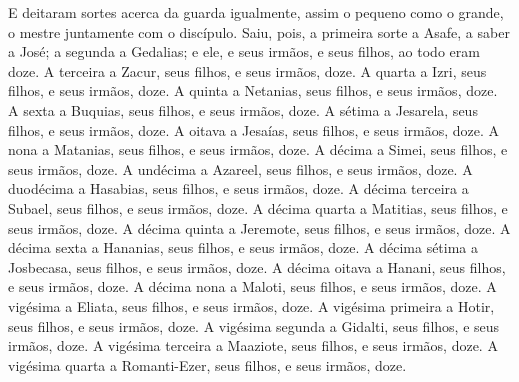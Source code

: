 E deitaram sortes acerca da guarda igualmente, assim o pequeno
como o grande, o mestre juntamente com o discípulo. Saiu, pois,
a primeira sorte a Asafe, a saber a José; a segunda a Gedalias; e
ele, e seus irmãos, e seus filhos, ao todo eram doze. A
terceira a Zacur, seus filhos, e seus irmãos, doze. A quarta
a Izri, seus filhos, e seus irmãos, doze. A quinta a
Netanias, seus filhos, e seus irmãos, doze. A sexta a
Buquias, seus filhos, e seus irmãos, doze. A sétima a
Jesarela, seus filhos, e seus irmãos, doze. A oitava a
Jesaías, seus filhos, e seus irmãos, doze. A nona a Matanias,
seus filhos, e seus irmãos, doze. A décima a Simei, seus
filhos, e seus irmãos, doze. A undécima a Azareel, seus
filhos, e seus irmãos, doze. A duodécima a Hasabias, seus
filhos, e seus irmãos, doze. A décima terceira a Subael, seus
filhos, e seus irmãos, doze. A décima quarta a Matitias, seus
filhos, e seus irmãos, doze. A décima quinta a Jeremote, seus
filhos, e seus irmãos, doze. A décima sexta a Hananias, seus
filhos, e seus irmãos, doze. A décima sétima a Josbecasa,
seus filhos, e seus irmãos, doze. A décima oitava a Hanani,
seus filhos, e seus irmãos, doze. A décima nona a Maloti,
seus filhos, e seus irmãos, doze. A vigésima a Eliata, seus
filhos, e seus irmãos, doze. A vigésima primeira a Hotir,
seus filhos, e seus irmãos, doze. A vigésima segunda a
Gidalti, seus filhos, e seus irmãos, doze. A vigésima
terceira a Maaziote, seus filhos, e seus irmãos, doze. A
vigésima quarta a Romanti-Ezer, seus filhos, e seus irmãos, doze.

\medskip

